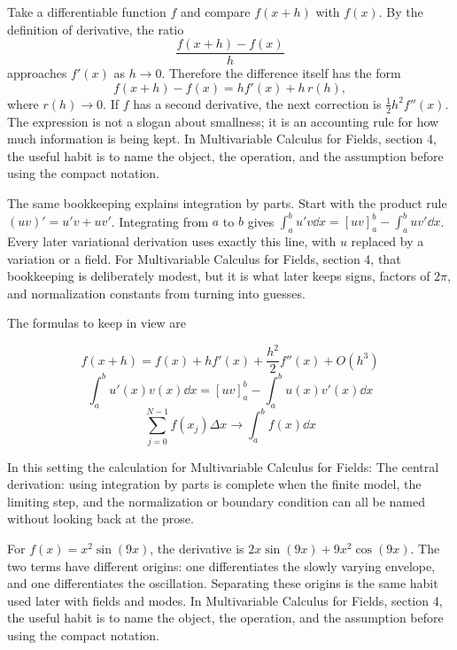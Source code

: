 Take a differentiable function \(f\) and compare \(f(x+h)\) with \(f(x)\).  By the definition of derivative, the ratio
\[
  \frac{f(x+h)-f(x)}{h}
\]
approaches \(f'(x)\) as \(h\to0\).  Therefore the difference itself has the form
\[
  f(x+h)-f(x)=hf'(x)+h\,r(h),
\]
where \(r(h)\to0\).  If \(f\) has a second derivative, the next correction is \(\frac12h^2f''(x)\).  The expression is not a slogan about smallness; it is an accounting rule for how much information is being kept.  In Multivariable Calculus for Fields, section 4, the useful habit is to name the object, the operation, and the assumption before using the compact notation.

The same bookkeeping explains integration by parts.  Start with the product rule \((uv)'=u'v+uv'\).  Integrating from \(a\) to \(b\) gives \(\int_a^b u'v\dd x=[uv]_a^b-\int_a^buv'\dd x\).  Every later variational derivation uses exactly this line, with \(u\) replaced by a variation or a field.  For Multivariable Calculus for Fields, section 4, that bookkeeping is deliberately modest, but it is what later keeps signs, factors of \(2\pi\), and normalization constants from turning into guesses.

The formulas to keep in view are

\[
  f(x+h)=f(x)+hf'(x)+\frac{h^2}{2}f''(x)+O(h^3)
\]
\[
  \int_a^b u'(x)v(x)\dd x=[uv]_a^b-\int_a^b u(x)v'(x)\dd x
\]
\[
  \sum_{j=0}^{N-1}f(x_j)\Delta x\longrightarrow \int_a^b f(x)\dd x
\]

In this setting the calculation for Multivariable Calculus for Fields: The central derivation: using integration by parts is complete when the finite model, the limiting step, and the normalization or boundary condition can all be named without looking back at the prose.




\begin{example}
For \(f(x)=x^2\sin(9x)\), the derivative is \(2x\sin(9x)+9x^2\cos(9x)\).  The two terms have different origins: one differentiates the slowly varying envelope, and one differentiates the oscillation.  Separating these origins is the same habit used later with fields and modes.  In Multivariable Calculus for Fields, section 4, the useful habit is to name the object, the operation, and the assumption before using the compact notation.
\end{example}



